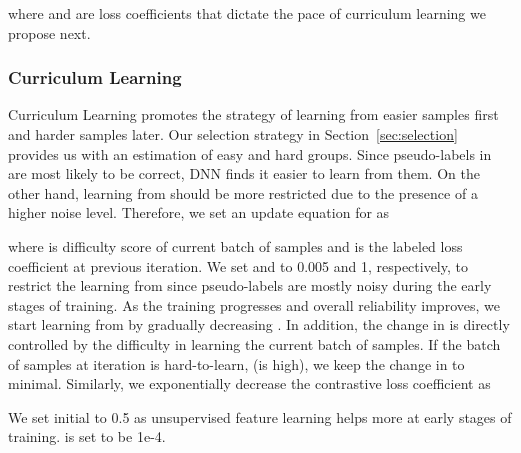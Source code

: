 \documentclass[10pt,twocolumn,letterpaper]{article}
\begin{document}
where  and  are loss coefficients that dictate the pace of curriculum learning we propose next. 

\vspace{-2mm}
\subsubsection{Curriculum Learning}
\vspace{-1mm}
Curriculum Learning \cite{bengio2009curriculum,zhou2018minimax} promotes the strategy of learning from easier samples first and harder samples later. Our selection strategy in Section~\ref{sec:selection} provides us with an estimation of easy and hard groups. Since pseudo-labels in  are most likely to be correct, DNN finds it easier to learn from them. On the other hand, learning from  should be more restricted due to the presence of a higher noise level. Therefore, we set an update equation for  as 

where  is difficulty score of current batch of samples and  is the labeled loss coefficient at previous iteration. We set  and  to 0.005 and 1, respectively, to restrict the learning from  since pseudo-labels are mostly noisy during the early stages of training. As the training progresses and overall reliability improves, we start learning from  by gradually decreasing . In addition, the change in  is directly controlled by the difficulty in learning the current batch of samples. If the batch of samples at iteration  is hard-to-learn, (\ie  is high), we keep the change in  to minimal. Similarly, we exponentially decrease the contrastive loss coefficient  as  

We set initial  to 0.5 as unsupervised feature learning helps more at early stages of training.  is set to be 1e-4. 

\vspace{-2mm}
\end{document}
